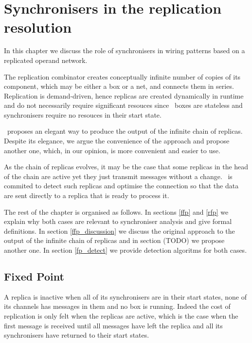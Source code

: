 \chapter{Synchronisers in the replication resolution}

In this chapter we discuss the role of synchronisers in wiring patterns based on a replicated operand network.

The replication combinator creates conceptually infinite number of copies of its component, which may be either a box or a net, and connects them in series. Replication is demand-driven, hence replicas are created dynamically in runtime and do not necessarily require significant resouces since \ak\ boxes are stateless and synchronisers require no resouces in their start state.

\ak\ proposes an elegant way to produce the output of the infinite chain of replicas. Despite its elegance, we argue the convenience of the approach and propose another one, which, in our opinion, is more convenient and easier to use.

As the chain of replicas evolves, it may be the case that some replicas in the head of the chain are active yet they just transmit messages without a change. \ak\ is commited to detect such replicas and optimise the connection so that the data are sent directly to a replica that is ready to process it. 

The rest of the chapter is organised as follows. In sections \ref{ffp} and \ref{rfp} we explain why both cases are relevant to synchroniser analysis and give formal definitions. In section \ref{ffp_discussion} we discuss the original approach to the output of the infinite chain of replicas and in section (TODO) we propose another one. In section \ref{fp_detect} we provide detection algoritms for both cases.


    \section{Fixed Point}
A replica is inactive when all of its synchronisers are in their start states, none of its channels has messages in them and no box is running. Indeed the cost of replication is only felt when the replicas are active, which is the case when the first message is received until all messages have left the replica and all its synchronisers have returned to their start states.

